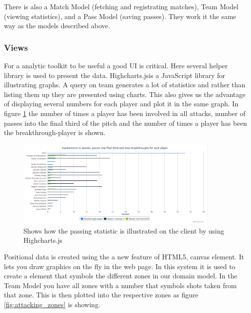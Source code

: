 There is also a Match Model (fetching and registrating matches), Team Model (viewing statistics), and a Pass Model (saving passes). They work it the same way as the models described above.


\subsubsection{Views}

For a analytic toolkit to be useful a good UI is critical. Here several helper library is used to present the data. Highcharts.js\footnotemark  is a JavaScript library for illustrating graphs. A query on team generates a lot of statistics and rather than listing them up they are presented using charts. This also gives us the advantage of displaying several numbers for each player and plot it in the same graph. In figure \ref{fig:chart} the number of times a player has been involved in all attacks, number of passes into the final third of the pitch and the number of times a player has been the breakthrough-player is shown.


\begin{figure}[ht!]
\centering
\includegraphics[width=100mm]{images/general/chart_passes.png}
\caption{Shows how the passing statistic is illustrated on the client by using Highcharts.js}
\label{fig:chart}
\end{figure}

Positional data is created using the a new feature of HTML5, canvas element. It lets you draw graphics on the fly in the web page. In this system it is used to create a element that symbols the different zones in our domain model. In the Team Model you have all zones with a number that symbols shots taken from that zone. This is then plotted into the respective zones as figure \ref{fig:attacking_zones} is showing.

